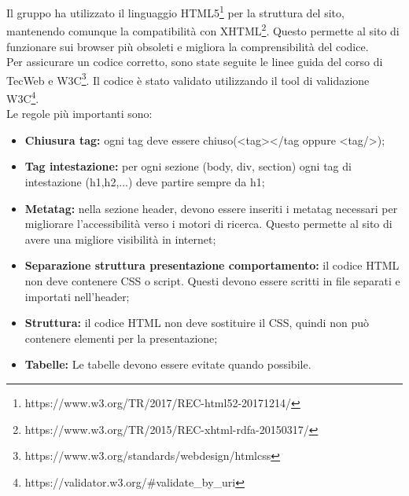 Il gruppo ha utilizzato il linguaggio HTML5\footnote{https://www.w3.org/TR/2017/REC-html52-20171214/} per la struttura del sito, mantenendo comunque la compatibilità con XHTML\footnote{https://www.w3.org/TR/2015/REC-xhtml-rdfa-20150317/}. Questo permette al sito di funzionare sui browser più obsoleti e migliora la comprensibilità del codice.\\
Per assicurare un codice corretto, sono state seguite le linee guida del corso di TecWeb e W3C\footnote{https://www.w3.org/standards/webdesign/htmlcss}. Il codice è stato validato utilizzando il tool di validazione W3C\footnote{https://validator.w3.org/\#validate\_by\_uri}.\\
Le regole più importanti sono:
\begin{itemize}
    \item \textbf{Chiusura tag:} ogni tag deve essere chiuso(<tag></tag oppure <tag/>);
    \item \textbf{Tag intestazione:} per ogni sezione (body, div, section) ogni tag di intestazione (h1,h2,...) deve partire sempre da h1;
    \item \textbf{Metatag:} nella sezione header, devono essere inseriti i metatag necessari per migliorare l'accessibilità verso i motori di ricerca. Questo permette al sito di avere una migliore visibilità in internet; 
    \item \textbf{Separazione struttura presentazione comportamento:} il codice HTML non deve contenere CSS o script. Questi devono essere scritti in file separati e importati nell'header;
    \item \textbf{Struttura:} il codice HTML non deve sostituire il CSS, quindi non può contenere elementi per la presentazione;\label{struttura}
    \item \textbf{Tabelle:} Le tabelle devono essere evitate quando possibile.
\end{itemize} 